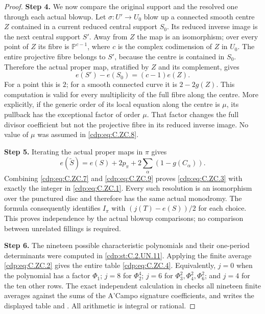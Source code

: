\begin{proof}
\noindent\textbf{Step 4.} We now compare the original support and
the resolved one through each actual
blowup. Let $\sigma:U'\to U_0$ blow up
a connected smooth centre $Z$ contained
in a current reduced central support
$S_0$. Its reduced inverse image is
the next central support $S'$. Away
from $Z$ the map is an isomorphism;
over every point of $Z$ its fibre is
$\mathbb P^{c-1}$, where $c$ is the
complex codimension of $Z$ in $U_0$.
The entire projective fibre belongs
to $S'$, because the centre is contained
in $S_0$. Therefore the actual proper
map, stratified by $Z$ and its complement,
gives
\[
                    e(S')-e(S_0)=(c-1)e(Z).
                                                               \tag{C.ZC.8}\label{cdp:eq:C.ZC.8}
\]
For a point this is $2$; for a smooth
connected curve it is $2-2g(Z)$.
This computation is valid for every
multiplicity of the full fibre along
the centre. More explicitly, if the
generic order of its local equation
along the centre is $\mu$, its pullback
has the exceptional factor of order
$\mu$. That factor changes the full
divisor coefficient but not the
projective fibre in its reduced
inverse image. No value of $\mu$
was assumed in \eqref{cdp:eq:C.ZC.8}.

\noindent\textbf{Step 5.} Iterating the actual proper maps in
$\pi$ gives
\[
 e(\widetilde S)=e(S)+2p_\pi
                        +2\sum_\alpha(1-g(C_\alpha)).
                                                               \tag{C.ZC.9}\label{cdp:eq:C.ZC.9}
\]
Combining \eqref{cdp:eq:C.ZC.7} and \eqref{cdp:eq:C.ZC.9}
proves \eqref{cdp:eq:C.ZC.3} with exactly the
integer in \eqref{cdp:eq:C.ZC.1}. Every such
resolution is an isomorphism over
the punctured disc and therefore
has the same actual monodromy.
The formula consequently identifies
$I_\pi$ with $(j(T)-e(S))/2$ for
each choice. This proves independence
by the actual blowup comparisons;
no comparison between unrelated
fillings is required.

\noindent\textbf{Step 6.} The nineteen possible characteristic
polynomials and their one-period
determinants were computed in \ref{cdp:st:C.2.UN.11}.
Applying the finite average \eqref{cdp:eq:C.ZC.2}
gives the entire table \eqref{cdp:eq:C.ZC.4}.
Equivalently, $j=0$ when the polynomial
has a factor $\Phi_1$; $j=8$ for
$\Phi_2^4$; $j=6$ for
$\Phi_3^2,\Phi_4^2,\Phi_6^2$;
and $j=4$ for the ten other rows.
The exact independent calculation
in 
checks all nineteen finite averages
against the sums of the A'Campo
signature coefficients, and writes
the displayed table and
.
All arithmetic is integral or rational.


\end{proof}
